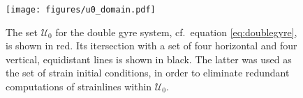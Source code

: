 \begin{figure}[htpb]
    \centering
    \texttt{[image: figures/u0\_domain.pdf]}
    \caption[The set $\mathcal{U}_{0}$ for the double gyre system]{The set
    $\mathcal{U}_{0}$ for the double gyre system, cf.\ equation
    \eqref{eq:doublegyre}, is shown in red. Its itersection with a set of four
    horizontal and four vertical, equidistant lines is shown in black. The
    latter was used as the set of strain initial conditions, in order to
    eliminate redundant computations of strainlines within $\mathcal{U}_{0}$.}
    \label{fig:u0_domain}
\end{figure}
